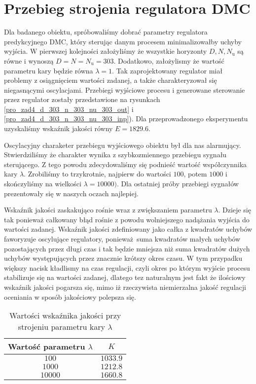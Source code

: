 \section{Przebieg strojenia regulatora DMC}
\label{pro4_DMC}
Dla badanego obiektu, spróbowaliśmy dobrać parametry regulatora predykcyjnego DMC, który 
sterując danym procesem minimalizowałby uchyby wyjścia. 
W pierwszej kolejności założyliśmy że wszystkie horyzonty
$D, N, N_{\mathrm{u}}$ są równe i wynoszą $D = N = N_{\mathrm{u}} = \num{303}$. 
Dodatkowo, założylismy że wartość parametru kary będzie równa $\lambda = 1$.
Tak zaprojektowany regulator miał problemy z osiągnięciem wartości zadanej, 
a także charakteryzował się niegasnącymi oscylacjami. Przebiegi wyjściowe procesu 
i generowane sterowanie przez regulator zostały przedstawione na rysunkach  
\ref{pro_zad4_d_303_n_303_nu_303_out} i \ref{pro_zad4_d_303_n_303_nu_303_inp}). Dla 
przeprowadzonego eksperymentu uzyskaliśmy wskaźnik jakości równy $E = \num{1829.6}$.

Oscylacyjny charaketer przebiegu wyjściowego obiektu był dla nas alarmujący.
Stwierdziliśmy że charakter wynika z szybkozmiennego przebiegu sygnału sterującego.
Z tego powodu zdecydowaliśmy się podnieść wartość współczynnika kary $\lambda$. 
Zrobiliśmy to trzykrotnie, najpierw do wartości $\num{100}$, potem $\num{1000}$ i 
skończyliśmy na wielkości $\lambda = \num{10000})$. 
Dla ostatniej próby przebiegi sygnałów prezentowały się w naszych oczach najlepiej.

Wskaźnik jakości zaskakująco rośnie wraz z zwiększaniem parametru $\lambda$. Dzieje się
tak ponieważ całkowany błąd rośnie z powodu wolniejszego nadążania wyjścia do wartości zadanej.
Wskaźnik jakości zdefiniowany jako całka z kwadratów uchybów faworyzuje oscylujące regulatory,
ponieważ suma kwadratów małych uchybów pozostających przez długi czas i tak będzie mniejsza niż 
suma kwadratów dużych uchybów występujących przez znacznie krótszy okres czasu. W tym przypadku 
większy nacisk kładlismy na czas regulacji, czyli okres po którym wyjście procesu stabilizuje się na 
wartości zadanej, dlatego tez naturalnym jest fakt że ilościowy wskaźnik jakości pogarsza się, mimo iż rzeczywista
niemierzalna jakość regulacji oceniania w sposób jakościowy polepsza się.  

\begin{table}[h]
    \centering
    \begin{tabular}{|c|c|}
    \hline
    Wartość parametru $\lambda$& $K$ \\ \hline
    $\num{100}$ & $\num{1033.9}$ \\
    $\num{1000}$ & $\num{1212.8}$ \\
    $\num{10000}$& $\num{1660.8}$  \\ \hline
    \end{tabular}
    \caption{Wartości wskaźnika jakości przy strojeniu parametru kary $\lambda$}
    \label{pro4_dmc_lambdy}
\end{table}

